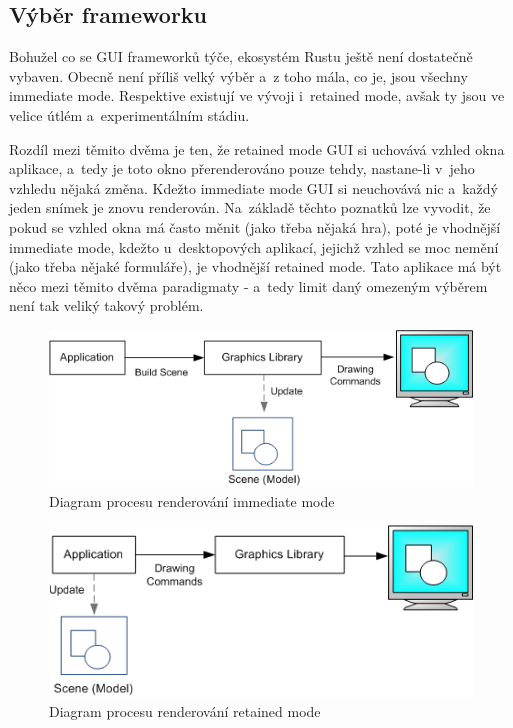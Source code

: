 \documentclass[a4paper, 12pt, twoside]{article} %
\begin{document}
	\subsection{Výběr frameworku}
		Bohužel co se GUI frameworků týče, ekosystém Rustu ještě není dostatečně vybaven. Obecně není příliš velký výběr a~z toho mála, co je, jsou všechny immediate mode. Respektive existují ve vývoji i~retained mode, avšak ty jsou ve velice útlém a~experimentálním stádiu.

		Rozdíl mezi těmito dvěma je ten, že retained mode GUI si uchovává vzhled okna aplikace, a~tedy je toto okno přerenderováno pouze tehdy, nastane-li v~jeho vzhledu nějaká změna. Kdežto immediate mode GUI si neuchovává nic a~každý jeden snímek je znovu renderován. Na~základě těchto poznatků lze vyvodit, že pokud se vzhled okna má často měnit (jako třeba nějaká hra), poté je vhodnější immediate mode, kdežto u~desktopových aplikací, jejichž vzhled se moc nemění (jako třeba nějaké formuláře), je vhodnější retained mode. Tato aplikace má být něco mezi těmito dvěma paradigmaty - a~tedy limit daný omezeným výběrem není tak veliký takový problém.
		\begin{center}
			\begin{figure}[H]
				\centering
				\includegraphics[width=.82\linewidth]{imm_mod}
				\caption{Diagram procesu renderování immediate mode\cite{imm_mod}}
				\label{fig:imm_mod}
			\end{figure}
		\end{center}
		\begin{center}
			\begin{figure}[H]
				\centering
				\includegraphics[width=.82\linewidth]{ret_mod}
				\caption{Diagram procesu renderování retained mode\cite{ret_mod}}
				\label{fig:ret_mod}
			\end{figure}
		\end{center}
		
\end{document}
